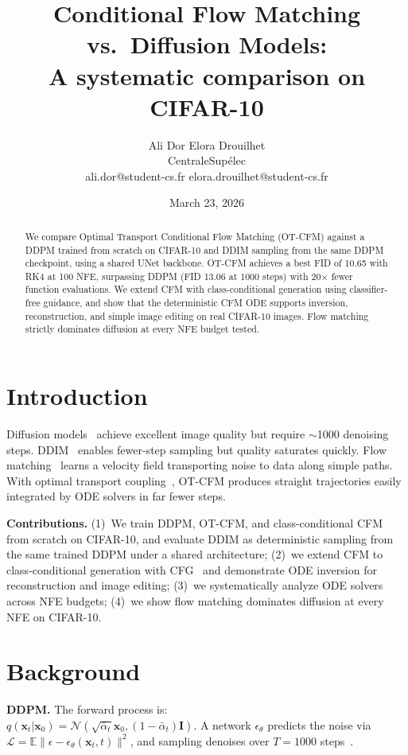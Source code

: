 \documentclass[10pt]{article}
\title{Conditional Flow Matching vs.\ Diffusion Models:\\A systematic comparison on CIFAR-10}
\author{
  Ali Dor \quad Elora Drouilhet \\
  CentraleSupélec \\
  ali.dor@student-cs.fr \quad elora.drouilhet@student-cs.fr
}
\date{March 23, 2026}
\begin{document}
\fancyfoot[C]{\thepage}

\begin{abstract}
We compare Optimal Transport Conditional Flow Matching (OT-CFM) against a DDPM trained from scratch on CIFAR-10 and DDIM sampling from the same DDPM checkpoint, using a shared UNet backbone.
OT-CFM achieves a best FID of 10.65 with RK4 at 100 NFE, surpassing DDPM (FID 13.06 at 1000 steps) with 20$\times$ fewer function evaluations.
We extend CFM with class-conditional generation using classifier-free guidance, and show that the deterministic CFM ODE supports inversion, reconstruction, and simple image editing on real CIFAR-10 images.
Flow matching strictly dominates diffusion at every NFE budget tested.
\end{abstract}

\maketitle

\section{Introduction}

Diffusion models~\cite{ho2020denoising} achieve excellent image quality but require ${\sim}$1000 denoising steps.
DDIM~\cite{song2021denoising} enables fewer-step sampling but quality saturates quickly.
Flow matching~\cite{lipman2023flow,liu2023flow} learns a velocity field transporting noise to data along simple paths.
With optimal transport coupling~\cite{tong2024improving}, OT-CFM produces straight trajectories easily integrated by ODE solvers in far fewer steps.

\textbf{Contributions.}
(1)~We train DDPM, OT-CFM, and class-conditional CFM from scratch on CIFAR-10, and evaluate DDIM as deterministic sampling from the same trained DDPM under a shared architecture;
(2)~we extend CFM to class-conditional generation with CFG~\cite{ho2022classifier} and demonstrate ODE inversion for reconstruction and image editing;
(3)~we systematically analyze ODE solvers across NFE budgets;
(4)~we show flow matching dominates diffusion at every NFE on CIFAR-10.

\section{Background}

\textbf{DDPM.}
The forward process is: \\
$q(\mathbf{x}_t|\mathbf{x}_0) = \mathcal{N}(\sqrt{\bar\alpha_t}\mathbf{x}_0, (1{-}\bar\alpha_t)\mathbf{I})$.
A network $\epsilon_\theta$ predicts the noise via $\mathcal{L} = \mathbb{E}\|\epsilon - \epsilon_\theta(\mathbf{x}_t, t)\|^2$, and sampling denoises over $T{=}1000$ steps~\cite{ho2020denoising}.
\end{document}
